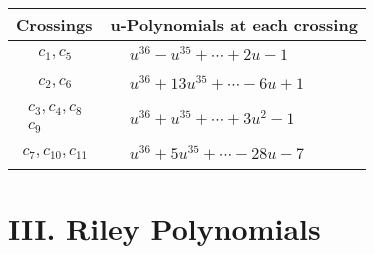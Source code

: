\documentclass[1p]{elsarticle_modified}
\theoremstyle{definition}
\begin{document}
\begin{tabular}{m{50pt}|m{274pt}}
Crossings & \hspace{64pt}u-Polynomials at each crossing \\
\hline $$\begin{aligned}c_{1},c_{5}\end{aligned}$$&$\begin{aligned}
&u^{36}- u^{35}+\cdots+2 u-1
\end{aligned}$\\
\hline $$\begin{aligned}c_{2},c_{6}\end{aligned}$$&$\begin{aligned}
&u^{36}+13 u^{35}+\cdots-6 u+1
\end{aligned}$\\
\hline $$\begin{aligned}c_{3},c_{4},c_{8}\\c_{9}\end{aligned}$$&$\begin{aligned}
&u^{36}+u^{35}+\cdots+3 u^2-1
\end{aligned}$\\
\hline $$\begin{aligned}c_{7},c_{10},c_{11}\end{aligned}$$&$\begin{aligned}
&u^{36}+5 u^{35}+\cdots-28 u-7
\end{aligned}$\\
\hline
\end{tabular}\newpage\renewcommand{\arraystretch}{1}
\centering \section*{ III. Riley Polynomials}
\end{document}
